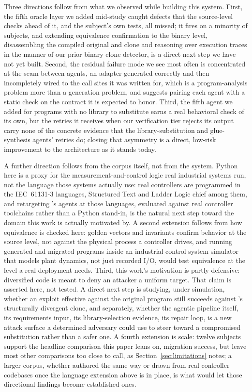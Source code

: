 Three directions follow from what we observed while building this system. First, the fifth oracle layer we added mid-study caught defects that the source-level checks ahead of it, and the subject's own tests, all missed; it fires on a minority of subjects, and extending equivalence confirmation to the binary level, disassembling the compiled original and clone and reasoning over execution traces in the manner of our prior binary clone detector, is a direct next step we have not yet built. Second, the residual failure mode we see most often is concentrated at the seam between agents, an adapter generated correctly and then incompletely wired to the call sites it was written for, which is a program-analysis problem more than a generation problem, and suggests pairing each agent with a static check on the contract it is expected to honor. Third, the fifth agent we added for programs with no library to substitute earns a real behavioral check of its own, but the retries it receives when our verification tier rejects its output carry none of the concrete evidence that the library-substitution and glue-synthesis agents' retries do; closing that asymmetry is a direct, low-risk improvement to the architecture as it stands today.

A further direction follows from the corpus itself, not from the system. Python here is a proxy for the measurement-and-control logic real industrial systems run, not the language those systems actually use: real controllers are programmed in the IEC~61131-3 languages, Structured Text and Ladder Logic chief among them, and retargeting \sys's agents at those languages, evaluated against real controller toolchains rather than a Python stand-in, is the natural next step toward the domain this work is actually motivated by. A second extension follows from how equivalence is checked here: golden vectors and invariants confirm behavior at the source level, not against the physical process a controller drives, and running generated and migrated programs inside an industrial control system simulator that models plant dynamics, not just recorded I/O, would test equivalence at the level a real deployment needs. Third, this work's motivation is partly defensive: diversified code is meant to deny an attacker a uniform target. That claim is asserted here, not tested. A direct next step is studying, under simulation, whether an exploit effective against the original program still succeeds against \sys's structurally divergent clone, and separately, whether the agentic pipeline itself, its requirements input, its library-selection evidence, its repair loop, is a new attack surface a determined adversary could use to steer \sys toward a compromised substitution rather than a safer one. A fourth extension is scale: twelve subjects support the headline comparison this paper leans on, migration success, but leave most other comparisons too close to call, as Section~\ref{sec:limitations} notes; a larger corpus, whether authored the same way or drawn from real controller codebases once the language extension above is in place, is what would let those directional findings become established ones.

